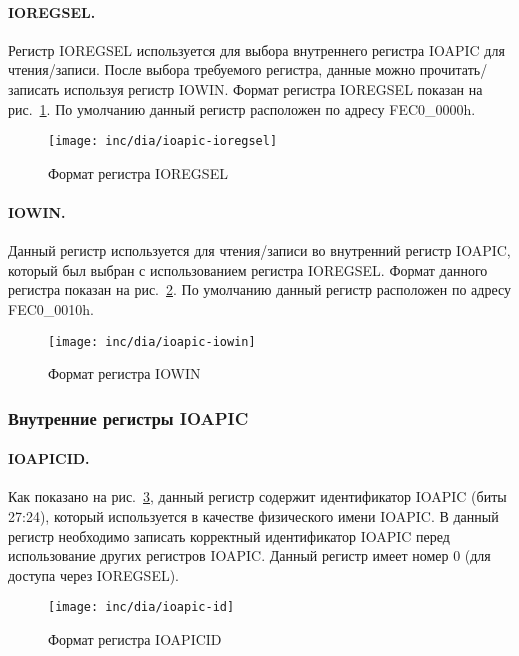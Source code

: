 \paragraph{IOREGSEL.} Регистр IOREGSEL используется для выбора внутреннего регистра IOAPIC для чтения/записи.
После выбора требуемого регистра, данные можно прочитать/записать используя регистр IOWIN. Формат регистра
IOREGSEL показан на рис.~\ref{fig:ioapic-ioregsel}. По умолчанию данный регистр расположен по адресу FEC0\_0000h.
\begin{figure}[ht!]
  \centering
  \texttt{[image: inc/dia/ioapic-ioregsel]}
  \caption{Формат регистра IOREGSEL}
  \label{fig:ioapic-ioregsel}
\end{figure}

\paragraph{IOWIN.} Данный регистр используется для чтения/записи во внутренний регистр IOAPIC, который был
выбран с использованием регистра IOREGSEL. Формат данного регистра показан на рис.~\ref{fig:ioapic-iowin}.
По умолчанию данный регистр расположен по адресу FEC0\_0010h.
\begin{figure}[ht!]
  \centering
  \texttt{[image: inc/dia/ioapic-iowin]}
  \caption{Формат регистра IOWIN}
  \label{fig:ioapic-iowin}
\end{figure}

\subsubsection*{Внутренние регистры IOAPIC}
\paragraph{IOAPICID.} Как показано на рис.~\ref{fig:ioapic-id}, данный регистр содержит идентификатор IOAPIC (биты 27:24),
который используется в качестве физического имени IOAPIC. В данный регистр необходимо записать корректный идентификатор
IOAPIC перед использование других регистров IOAPIC. Данный регистр имеет номер 0 (для доступа через IOREGSEL).
\begin{figure}[ht!]
  \centering
  \texttt{[image: inc/dia/ioapic-id]}
  \caption{Формат регистра IOAPICID}
  \label{fig:ioapic-id}
\end{figure}


